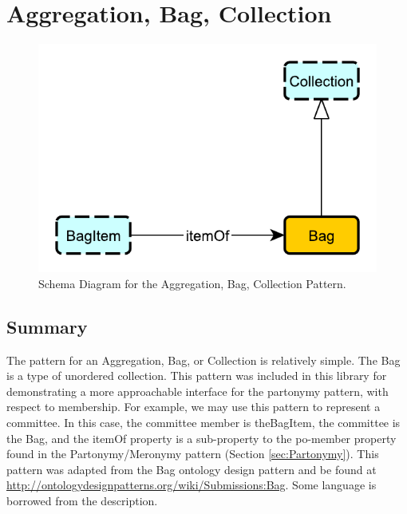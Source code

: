 \section{Aggregation, Bag, Collection}
\label{sec:Aggregation,}
\begin{figure}[h!]
\begin{center}
\includegraphics[width=.8\textwidth]{figures/aggregation}
\end{center}
\caption{Schema Diagram for the Aggregation, Bag, Collection Pattern.}
\label{fig:Aggregation,}
\end{figure}
\subsection{Summary}
\label{sum:Aggregation,}
The pattern for an Aggregation, Bag, or Collection is relatively simple. The Bag is a type of unordered collection. This pattern was included in this library for demonstrating a more approachable interface for the partonymy pattern, with respect to membership. For example, we may use this pattern to represent a committee. In this case, the committee member is the\textsf{BagItem}, the committee is the \textsf{Bag}, and the \textsf{itemOf} property is a sub-property to the \textsf{po-member} property found in the Partonymy/Meronymy pattern (Section \ref{sec:Partonymy}). This pattern was adapted from the Bag ontology design pattern and be found at \url{http://ontologydesignpatterns.org/wiki/Submissions:Bag}. Some language is borrowed from the description.

